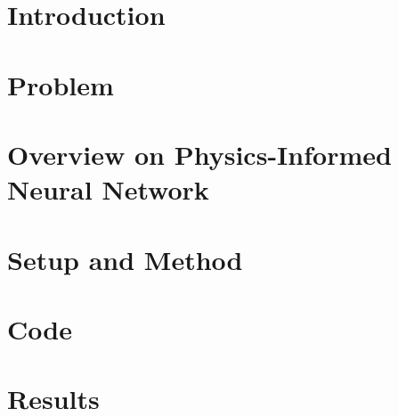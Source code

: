 \documentclass[12pt]{report}
\numberwithin{figure}{chapter}
\begin{document}
\chapter{Introduction}




\chapter{Problem}\label{cap: problem}

\chapter{Overview on Physics-Informed Neural Network}\label{cap: overview}


\chapter{Setup and Method} \label{cap: setup}
\chapter{Code}\label{cap: code}


\chapter{Results}



\printbibliography[title={References}]
\end{document}
